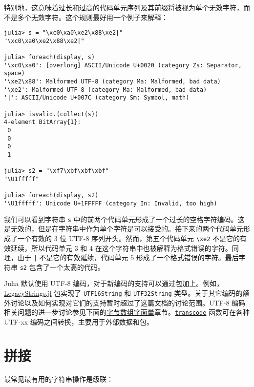 特别地，这意味着过长和过高的代码单元序列及其前缀将被视为单个无效字符，而不是多个无效字符。这个规则最好用一个例子来解释：




\begin{verbatim}
julia> s = "\xc0\xa0\xe2\x88\xe2|"
"\xc0\xa0\xe2\x88\xe2|"

julia> foreach(display, s)
'\xc0\xa0': [overlong] ASCII/Unicode U+0020 (category Zs: Separator, space)
'\xe2\x88': Malformed UTF-8 (category Ma: Malformed, bad data)
'\xe2': Malformed UTF-8 (category Ma: Malformed, bad data)
'|': ASCII/Unicode U+007C (category Sm: Symbol, math)

julia> isvalid.(collect(s))
4-element BitArray{1}:
 0
 0
 0
 1

julia> s2 = "\xf7\xbf\xbf\xbf"
"\U1fffff"

julia> foreach(display, s2)
'\U1fffff': Unicode U+1FFFFF (category In: Invalid, too high)
\end{verbatim}



我们可以看到字符串 \texttt{s} 中的前两个代码单元形成了一个过长的空格字符编码。这是无效的，但是在字符串中作为单个字符是可以接受的。接下来的两个代码单元形成了一个有效的 3 位 UTF-8 序列开头。然而，第五个代码单元 \texttt{{\textbackslash}xe2} 不是它的有效延续，所以代码单元 3 和 4 在这个字符串中也被解释为格式错误的字符。同理，由于 \texttt{|} 不是它的有效延续，代码单元 5 形成了一个格式错误的字符。最后字符串 \texttt{s2} 包含了一个太高的代码。



Julia 默认使用 UTF-8 编码，对于新编码的支持可以通过包加上。例如，\href{https://github.com/JuliaStrings/LegacyStrings.jl}{LegacyStrings.jl} 包实现了 \texttt{UTF16String} 和 \texttt{UTF32String} 类型。关于其它编码的额外讨论以及如何实现对它们的支持暂时超过了这篇文档的讨论范围。UTF-8 编码相关问题的进一步讨论参见下面的\hyperlink{1529513445769909572}{字节数组字面量}章节。\hyperlink{11147209877072452260}{\texttt{transcode}} 函数可在各种 UTF-xx 编码之间转换，主要用于外部数据和包。



\hypertarget{3486870924145745190}{}


\section{拼接}



最常见最有用的字符串操作是级联：




